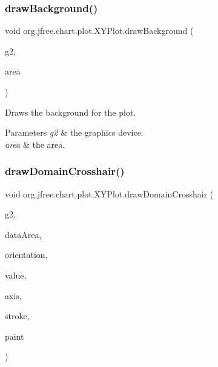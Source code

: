 \subsubsection{\texorpdfstring{draw\+Background()}{drawBackground()}}
{\footnotesize\ttfamily void org.\+jfree.\+chart.\+plot.\+X\+Y\+Plot.\+draw\+Background (\begin{DoxyParamCaption}\item[{Graphics2D}]{g2,  }\item[{Rectangle2D}]{area }\end{DoxyParamCaption})}

Draws the background for the plot.


\begin{DoxyParams}{Parameters}
{\em g2} & the graphics device. \\
\hline
{\em area} & the area. \\
\hline
\end{DoxyParams}
\mbox{\label{classorg_1_1jfree_1_1chart_1_1plot_1_1_x_y_plot_a307fe743a7d29edbe05b11d03d26b32d}} 
\subsubsection{\texorpdfstring{draw\+Domain\+Crosshair()}{drawDomainCrosshair()}}
{\footnotesize\ttfamily void org.\+jfree.\+chart.\+plot.\+X\+Y\+Plot.\+draw\+Domain\+Crosshair (\begin{DoxyParamCaption}\item[{Graphics2D}]{g2,  }\item[{Rectangle2D}]{data\+Area,  }\item[{\mbox{\hyperlink{classorg_1_1jfree_1_1chart_1_1plot_1_1_plot_orientation}{Plot\+Orientation}}}]{orientation,  }\item[{double}]{value,  }\item[{\mbox{\hyperlink{classorg_1_1jfree_1_1chart_1_1axis_1_1_value_axis}{Value\+Axis}}}]{axis,  }\item[{Stroke}]{stroke,  }\item[{Paint}]{paint }\end{DoxyParamCaption})\hspace{0.3cm}{\ttfamily [protected]}}

